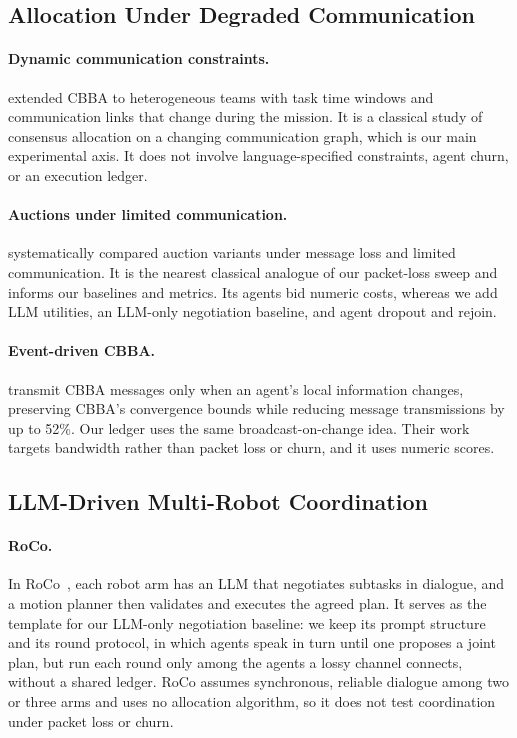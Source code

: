 \documentclass[letterpaper]{article}
\begin{document}
\subsection{Allocation Under Degraded Communication}

\paragraph{Dynamic communication constraints.}
\citet{ponda2010dynamic} extended CBBA to heterogeneous teams with task time windows and communication links that change during the mission. It is a classical study of consensus allocation on a changing communication graph, which is our main experimental axis. It does not involve language-specified constraints, agent churn, or an execution ledger.

\paragraph{Auctions under limited communication.}
\citet{otte2020auctions} systematically compared auction variants under message loss and limited communication. It is the nearest classical analogue of our packet-loss sweep and informs our baselines and metrics. Its agents bid numeric costs, whereas we add LLM utilities, an LLM-only negotiation baseline, and agent dropout and rejoin.

\paragraph{Event-driven CBBA.}
\citet{sao2025edcbba} transmit CBBA messages only when an agent's local information changes, preserving CBBA's convergence bounds while reducing message transmissions by up to 52\%. Our ledger uses the same broadcast-on-change idea. Their work targets bandwidth rather than packet loss or churn, and it uses numeric scores.

\subsection{LLM-Driven Multi-Robot Coordination}

\paragraph{RoCo.}
In RoCo~\citep{mandi2024roco}, each robot arm has an LLM that negotiates subtasks in dialogue, and a motion planner then validates and executes the agreed plan. It serves as the template for our LLM-only negotiation baseline: we keep its prompt structure and its round protocol, in which agents speak in turn until one proposes a joint plan, but run each round only among the agents a lossy channel connects, without a shared ledger. RoCo assumes synchronous, reliable dialogue among two or three arms and uses no allocation algorithm, so it does not test coordination under packet loss or churn.
\end{document}
